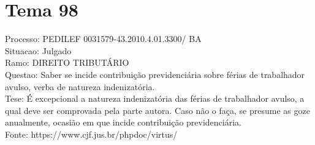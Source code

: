 \documentclass[12pt]{article}
\begin{document}
\section*{Tema 98}
Processo: PEDILEF 0031579-43.2010.4.01.3300/ BA\\
Situacao: Julgado\\
Ramo: DIREITO TRIBUTÁRIO\\
Questao: Saber se incide contribuição previdenciária sobre férias de trabalhador avulso, verba de natureza indenizatória.\\
Tese: É excepcional a natureza indenizatória das férias de trabalhador avulso, a qual deve ser comprovada pela parte autora. Caso não o faça, se presume as goze anualmente, ocasião em que incide contribuição previdenciária.\\
Fonte: https://www.cjf.jus.br/phpdoc/virtus/
\end{document}
